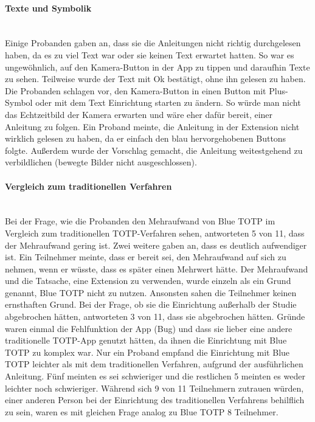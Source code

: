 \paragraph*{Texte und Symbolik}
\mbox{} \vspace{0.1cm} \\
Einige Probanden gaben an, dass sie die Anleitungen nicht richtig durchgelesen 
haben, da es zu viel Text war oder sie keinen Text erwartet hatten. So war es 
ungewöhnlich, auf den Kamera-Button in der App zu tippen und daraufhin Texte zu 
sehen. Teilweise wurde der Text mit \glqq Ok\grqq{} bestätigt, ohne ihn gelesen zu haben. 
Die Probanden schlagen vor, den Kamera-Button in einen Button mit Plus-Symbol 
oder mit dem Text \glqq Einrichtung starten\grqq{} zu ändern. So würde man nicht das 
Echtzeitbild der Kamera erwarten und wäre eher dafür bereit, einer Anleitung zu 
folgen. Ein Proband meinte, die Anleitung in der Extension nicht wirklich 
gelesen zu haben, da er einfach den blau hervorgehobenen Buttons folgte. 
Außerdem wurde der Vorschlag gemacht, die Anleitung weitestgehend zu 
verbildlichen (bewegte Bilder nicht ausgeschlossen).

\paragraph*{Vergleich zum traditionellen Verfahren}
\mbox{} \vspace{0.1cm} \\
Bei der Frage, wie die Probanden den Mehraufwand von Blue TOTP im Vergleich zum 
traditionellen TOTP-Verfahren sehen, antworteten 5 von 11, dass der Mehraufwand 
gering ist. Zwei weitere gaben an, dass es deutlich aufwendiger ist. Ein 
Teilnehmer meinte, dass er bereit sei, den Mehraufwand auf sich zu nehmen, wenn 
er wüsste, dass es später einen Mehrwert hätte. Der Mehraufwand und die 
Tatsache, eine Extension zu verwenden, wurde einzeln als ein Grund genannt, Blue 
TOTP nicht zu nutzen. Ansonsten sahen die Teilnehmer keinen ernsthaften Grund. 
Bei der Frage, ob sie die Einrichtung außerhalb der Studie abgebrochen hätten, 
antworteten 3 von 11, dass sie abgebrochen hätten. Gründe waren einmal die 
Fehlfunktion der App (Bug) und dass sie lieber eine andere traditionelle TOTP-App genutzt 
hätten, da ihnen die Einrichtung mit Blue TOTP zu komplex war. Nur ein Proband empfand die Einrichtung mit Blue TOTP leichter als mit 
dem traditionellen Verfahren, aufgrund der ausführlichen Anleitung. Fünf meinten 
es sei schwieriger und die restlichen 5 meinten es weder leichter noch 
schwieriger. Während sich 9 von 11 Teilnehmern zutrauen würden, einer anderen 
Person bei der Einrichtung des traditionellen Verfahrens behilflich zu sein, 
waren es mit gleichen Frage analog zu Blue TOTP 8 Teilnehmer.

